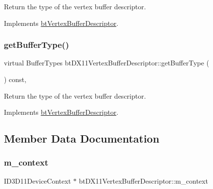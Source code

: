 Return the type of the vertex buffer descriptor. 

Implements \hyperlink{classbtVertexBufferDescriptor_a1744d7c3b3452f130a215927d63ab130}{bt\+Vertex\+Buffer\+Descriptor}.

\mbox{\label{classbtDX11VertexBufferDescriptor_aaa92499e7319fda25f7cd787b14c4933}} 
\subsubsection{\texorpdfstring{get\+Buffer\+Type()}{getBufferType()}\hspace{0.1cm}{\footnotesize\ttfamily [2/2]}}
{\footnotesize\ttfamily virtual Buffer\+Types bt\+D\+X11\+Vertex\+Buffer\+Descriptor\+::get\+Buffer\+Type (\begin{DoxyParamCaption}{ }\end{DoxyParamCaption}) const\hspace{0.3cm}{\ttfamily [inline]}, {\ttfamily [virtual]}}

Return the type of the vertex buffer descriptor. 

Implements \hyperlink{classbtVertexBufferDescriptor_a1744d7c3b3452f130a215927d63ab130}{bt\+Vertex\+Buffer\+Descriptor}.



\subsection{Member Data Documentation}
\mbox{\label{classbtDX11VertexBufferDescriptor_ad574be692b3fea8a0af8287ac7b8cb38}} 
\subsubsection{\texorpdfstring{m\+\_\+context}{m\_context}}
{\footnotesize\ttfamily I\+D3\+D11\+Device\+Context $\ast$ bt\+D\+X11\+Vertex\+Buffer\+Descriptor\+::m\+\_\+context\hspace{0.3cm}{\ttfamily [protected]}}

